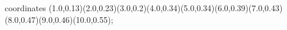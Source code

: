 					coordinates { (1.0,0.13)(2.0,0.23)(3.0,0.2)(4.0,0.34)(5.0,0.34)(6.0,0.39)(7.0,0.43)(8.0,0.47)(9.0,0.46)(10.0,0.55)};